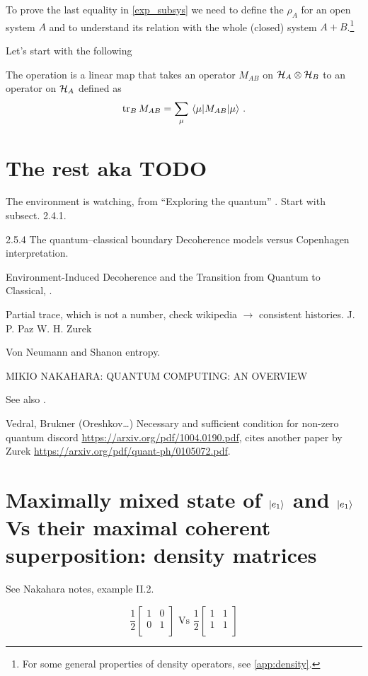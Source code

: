 To prove the last equality in \eqref{exp_subsys} we need to define the
 $\rho_A$ for an open system $A$ and to understand its
relation with the whole (closed) system $A+B$.\footnote{
  For some general properties of density operators, see \ref{app:density}.
}

Let's start with the following
\begin{definition}
  The  operation
  is a linear map
  that takes an operator
  $M_{AB}$ on $\mathcal{H}_A \otimes \mathcal{H}_B$
  to an operator on $\mathcal{H}_A$ defined as
  \[
    \tr_B M_{AB} = \sum_{\mu} \matrixel{\mu}{M_{AB}}{\mu}
    \, .
  \]
\end{definition}


\section{The rest aka TODO}

The environment is watching, from ``Exploring the quantum''
\parencite[Ch. 4]{Haroche_Exploring}. Start with subsect. 2.4.1.

2.5.4 The quantum–classical boundary
Decoherence models versus Copenhagen interpretation.

Environment-Induced Decoherence and the Transition from Quantum to Classical,
\cite{Zurek_Fundamentals}.

Partial trace, which is not a number, check wikipedia $\rightarrow$ consistent histories.
J. P. Paz W. H. Zurek

Von Neumann and Shanon entropy.

MIKIO NAKAHARA: QUANTUM COMPUTING: AN OVERVIEW

See also \cite{Schlosshauer_Decoherence}.

Vedral, Brukner (Oreshkov\dots)
Necessary and sufficient condition for non-zero quantum discord
\url{https://arxiv.org/pdf/1004.0190.pdf},
cites another paper by Zurek \url{https://arxiv.org/pdf/quant-ph/0105072.pdf}.

\section{Maximally mixed state of $\ket{e_1}$ and $\ket{e_1}$
Vs their maximal coherent superposition: density matrices}

See Nakahara notes, example II.2.

$$
\frac{1}{2}\begin{bmatrix}
  1 &0  \\
  0 &1  \\
\end{bmatrix}
\text{ Vs }
\frac{1}{2}\begin{bmatrix}
  1 &1  \\
  1 &1  \\
\end{bmatrix}
$$


